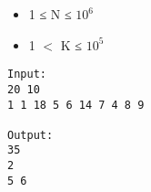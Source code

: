 \begin{itemize}
	\item     1 ≤ N ≤ $10^{6}$
	\item     1 $<$ K ≤ $10^{5}$
\end{itemize}
\begin{verbatim}
Input:
20 10
1 1 18 5 6 14 7 4 8 9

Output:
35
2
5 6
\end{verbatim}